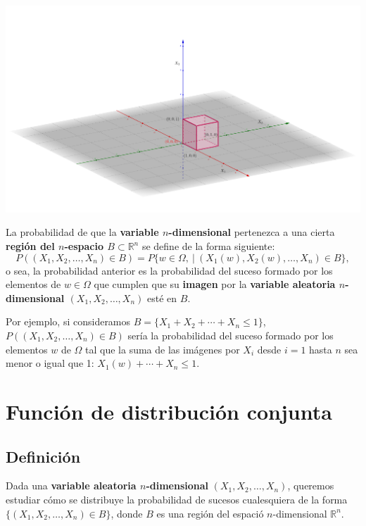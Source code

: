 \documentclass[]{book}
\begin{document}
\includegraphics{Images/Ej3DCubo.png}

La probabilidad de que la \textbf{variable \(n\)-dimensional} pertenezca a una cierta \textbf{región del \(n\)-espacio \(B\subset \mathbb{R}^n\)} se define de la forma siguiente:
\[
P((X_1,X_2,\ldots,X_n)\in B)=P\{w\in \Omega,\ |\ (X_1(w),X_2(w),\ldots,X_n)\in B\},
\]
o sea, la probabilidad anterior es la probabilidad del suceso formado por los elementos de \(w\in\Omega\) que cumplen que su \textbf{imagen} por la \textbf{variable aleatoria \(n\)-dimensional \((X_1,X_2,\ldots,X_n)\)} esté en \(B\).

Por ejemplo, si consideramos \(B=\{X_1+X_2+\cdots +X_n\leq 1\}\), \(P((X_1,X_2,\ldots,X_n)\in B)\) sería la probabilidad del suceso formado por los elementos \(w\) de \(\Omega\) tal que la suma de las imágenes por \(X_i\) desde \(i=1\) hasta \(n\) sea menor o igual que 1: \(X_1(w)+\cdots +X_n\leq 1\).

\hypertarget{funciuxf3n-de-distribuciuxf3n-conjunta-1}{%
\section{Función de distribución conjunta}\label{funciuxf3n-de-distribuciuxf3n-conjunta-1}}

\hypertarget{definiciuxf3n-6}{%
\subsection{Definición}\label{definiciuxf3n-6}}

Dada una \textbf{variable aleatoria \(n\)-dimensional} \((X_1,X_2,\ldots,X_n)\), queremos estudiar cómo se distribuye la probabilidad de sucesos cualesquiera de la forma \(\{(X_1,X_2,\ldots,X_n)\in B\}\), donde \(B\) es una región del espació \(n\)-dimensional \(\mathbb{R}^n\).
\end{document}
